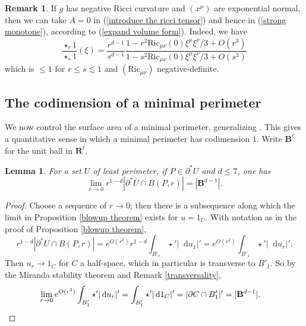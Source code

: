 \documentclass[reqno,10pt]{amsart}
\newcommand{\RR}{\mathbf{R}}
\newcommand{\Ball}{\mathbf{B}}
\newcommand{\Ric}{\mathrm{Ric}}
\newcommand*\dif{\mathop{}\!\mathrm{d}}
\newtheorem{lemma}[theorem]{Lemma}
\theoremstyle{definition}
\newtheorem{remark}[theorem]{Remark}
\numberwithin{equation}{section}
\begin{document}
\begin{remark}\label{Negative Ricci}
If $g$ has negative Ricci curvature and $(x^\mu)$ are exponential normal, then we can take $A = 0$ in (\ref{introduce the ricci tensor}) and hence in (\ref{strong monotone}), according to (\ref{expand volume form}).
Indeed, we have
$$\frac{\star_r 1}{\star_s 1}(\xi) = \frac{r^{d - 1}}{s^{d - 1}} \frac{1 - r^2 \Ric_{\mu \nu}(0) \xi^\mu \xi^\nu/3 + O(r^3)}{1 - s^2 \Ric_{\mu \nu}(0) \xi^\mu \xi^\nu/3 + O(s^3)}$$
which is $\leq 1$ for $r \leq s \lesssim 1$ and $(\Ric_{\mu\nu})$ negative-definite.
\end{remark}

\subsection{The codimension of a minimal perimeter}
We now control the surface area of a minimal perimeter, generalizing \cite[Remark 5.13]{Giusti77}.
This gives a quantitative sense in which a minimal perimeter has codimension $1$.
Write $\Ball^\ell$ for the unit ball in $\RR^\ell$.

\begin{lemma}\label{least perimeter minimal size}
For a set $U$ of least perimeter, if $P \in \partial^* U$ and $d \leq 7$, one has
$$\lim_{r \to 0} r^{1 - d} |\partial^* U \cap B(P, r)| = |\Ball^{d - 1}|.$$
\end{lemma}
\begin{proof}
Choose a sequence of $r \to 0$; then there is a subsequence along which the limit in Proposition \ref{blowup theorem} exists for $u = 1_U$.
With notation as in the proof of Proposition \ref{blowup theorem},
$$r^{1 - d} |\partial^* U \cap B(P, r)| = e^{O(r^2)} r^{1 - d}\int_{B'_r} \star'|\dif u_1|' = e^{O(r^2)} \int_{B'_1} \star'|\dif u_r|'.$$
Then $u_r \to 1_C$ for $C$ a half-space, which in particular is transverse to $B'_1$.
So by the Miranda stability theorem and Remark \ref{transversality},
\begin{align*}
\lim_{r \to 0} e^{O(r^2)} \int_{B'_1} \star'|\dif u_r|' &= \int_{B'_1} \star'|\dif 1_C|' = |\partial C \cap B'_1|' = |\Ball^{d - 1}|. \qedhere
\end{align*}
\end{proof}
\end{document}
